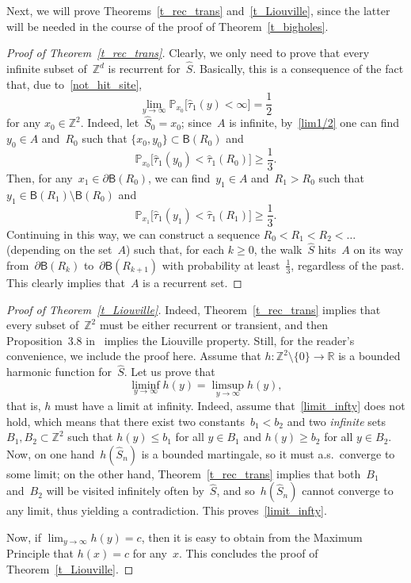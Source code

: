 \documentclass[11pt]{article}
\theoremstyle{definition}
\numberwithin{equation}{section}
\numberwithin{figure}{section}
\numberwithin{table}{section}
\newcommand{\1}[1]{{\mathbf 1}{\{#1\}}}
\newcommand{\Z}{\mathbb{Z}}
\newcommand{\R}{{\mathbb R}}
\newcommand{\s}{{\widehat S}}
\newcommand{\8}{{\infty}}
\newcommand{\IP}{{\mathbb P}}
\newcommand{\htau}{\widehat{\tau}}
\newcommand{\B}{{\mathsf B}}
\begin{document}
Next, we will prove Theorems~\ref{t_rec_trans} and~\ref{t_Liouville}, since the latter will be needed in the course of the proof of Theorem~\ref{t_bigholes}.

\begin{proof}[Proof of Theorem~\ref{t_rec_trans}]
Clearly, we only need to prove that every infinite subset of~$\Z^d$ is recurrent for~$\s$. Basically, this is a consequence of the fact that, due to~\eqref{not_hit_site},
\begin{equation}\label{lim1/2}
\lim_{y\to\infty} \IP_{x_0}\big[\htau_1(y)<\infty\big] = \frac{1}{2}
\end{equation}
for any $x_0\in\Z^2$. Indeed, let~$\s_0=x_0$; since~$A$ is infinite, by~\eqref{lim1/2} one can find~$y_0\in A$ and~$R_0$ such that $\{x_0,y_0\}\subset \B(R_0)$ and
\[
\IP_{x_0}\big[\htau_1(y_0)<\htau_1(R_0)\big] \geq \frac{1}{3}.
\]
Then, for any~$x_1\in \partial\B(R_0)$, we can find~$y_1\in A$ and~$R_1>R_0$ such that $y_1\in \B(R_1)\setminus \B(R_0)$ and
\[
\IP_{x_1}\big[\htau_1(y_1)<\htau_1(R_1)\big] \geq \frac{1}{3}.
\]
Continuing in this way, we can construct a sequence $R_0<R_1<R_2<\ldots$ (depending on the set~$A$) such that, for each $k\geq 0$, the walk~$\s$ hits~$A$ on its way from~$\partial\B(R_k)$ to~$\partial\B(R_{k+1})$ with probability at least~$\frac{1}{3}$, regardless of the past. This clearly implies that~$A$ is a recurrent set.
\end{proof}

\begin{proof}[Proof of Theorem~\ref{t_Liouville}]
Indeed, Theorem~\ref{t_rec_trans} implies that every subset of~$\Z^2$ must be either recurrent or transient, and then Proposition~3.8 in~\cite[Chapter~2]{R84} implies the Liouville property. Still, for the reader's convenience, we include the proof here. Assume that $h:\Z^2\setminus\{0\} \to \R$ is a bounded harmonic function for~$\s$. Let us prove that
\begin{equation}\label{limit_infty}
\liminf_{y\to \infty}h(y) = \limsup_{y\to \infty}h(y),
\end{equation}
that is, $h$ must have a limit at infinity. Indeed, assume that~\eqref{limit_infty} does not hold, which means that there exist two constants~$b_1<b_2$ and two \emph{infinite} sets $B_1,B_2\subset\Z^2$ such that $h(y)\leq b_1$ for all $y\in B_1$ and $h(y) \geq b_2$ for all $y\in B_2$. Now, on one hand~$h(\s_n)$ is a bounded martingale, so it must a.s.\ converge to some limit; on the other hand, Theorem~\ref{t_rec_trans} implies that both~$B_1$ and~$B_2$ will be visited infinitely often by~$\s$, and so~$h(\s_n)$ cannot converge to any limit, thus yielding a contradiction. This proves~\eqref{limit_infty}.

Now, if $\lim_{y\to \infty}h(y)=c$, then it is easy to obtain from the Maximum Principle that $h(x)=c$ for any~$x$. This concludes the proof of Theorem~\ref{t_Liouville}.
\end{proof}
\end{document}
